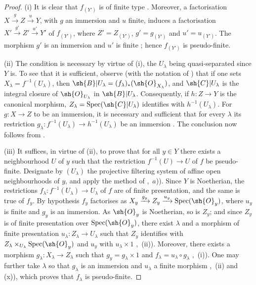\begin{proof}
(i) It is clear that $f_{(Y')}$ is of finite type . Moreover, a factorisation $X\xrightarrow{g}Z\xrightarrow{u}Y$, with $g$ an immersion and $u$ finite, induces a factorisation $X'\xrightarrow{g'}Z'\xrightarrow{u'}Y'$ of $f_{(Y')}$, where $Z'=Z_{(Y')}$, $g'=g_{(Y')}$ and $u'=u_{(Y')}$. The morphism $g'$ is an immersion  and $u'$ is finite ; hence $f_{(Y')}$ is pseudo-finite.

(ii) The condition is necessary by virtue of (i), the $U_\lambda$ being quasi-separated since $Y$ is.
To see that it is sufficient, observe (with the notation of ) that if one sets $X_\lambda=f^{-1}(U_\lambda)$, then $\sh{B}|U_\lambda=(f_\lambda)_*(\sh{O}_{X_\lambda})$, and $\sh{C}|U_\lambda$ is the integral closure of $\sh{O}_{U_\lambda}$ in $\sh{B}|U_\lambda$. Consequently, if $h:Z\to Y$ is the canonical morphism, $Z_\lambda=\operatorname{Spec}(\sh{C}|U_\lambda)$ identifies with $h^{-1}(U_\lambda)$. For $g:X\to Z$ to be an immersion, it is necessary and sufficient that for every $\lambda$ its restriction $g_\lambda:f^{-1}(U_\lambda)\to h^{-1}(U_\lambda)$ be an immersion . The conclusion now follows from .

(iii) It suffices, in virtue of (ii), to prove that for all $y\in Y$ there exists a neighbourhood $U$ of $y$ such that the restriction $f^{-1}(U)\to U$ of $f$ be pseudo-finite.
Designate by $(U_\lambda)$ the projective filtering system of affine open neighbourhoods of $y$, and apply the method of ,~$a$)).
Since $Y$ is Noetherian, the restrictions $f_\lambda:f^{-1}(U_\lambda)\to U_\lambda$ of $f$ are of finite presentation, and the same is true of $f_y$.
By hypothesis $f_y$ factorises as $X_y\xrightarrow{g_y}Z_y\xrightarrow{u_y}\operatorname{Spec}(\sh{O}_y)$, where $u_y$ is finite and $g_y$ is an immersion.
As $\sh{O}_y$ is Noetherian, so is $Z_y$; and since $Z_y$ is of finite presentation over $\operatorname{Spec}(\sh{O}_y)$, there exist $\lambda$ and a morphism of finite presentation $u_\lambda:Z_\lambda\to U_\lambda$ such that $Z_y$ identifies with $Z_\lambda\times_{U_\lambda}\operatorname{Spec}(\sh{O}_y)$ and $u_y$ with $u_\lambda\times 1$ ,~(ii)). Moreover, there exists a morphism $g_\lambda:X_\lambda\to Z_\lambda$ such that $g_y=g_\lambda\times 1$ and $f_\lambda=u_\lambda\circ g_\lambda$ ,~(i)). One may further take $\lambda$ so that $g_\lambda$ is an immersion and $u_\lambda$ a finite morphism ,~(ii) and (x)), which proves that $f_\lambda$ is pseudo-finite.
\end{proof}


